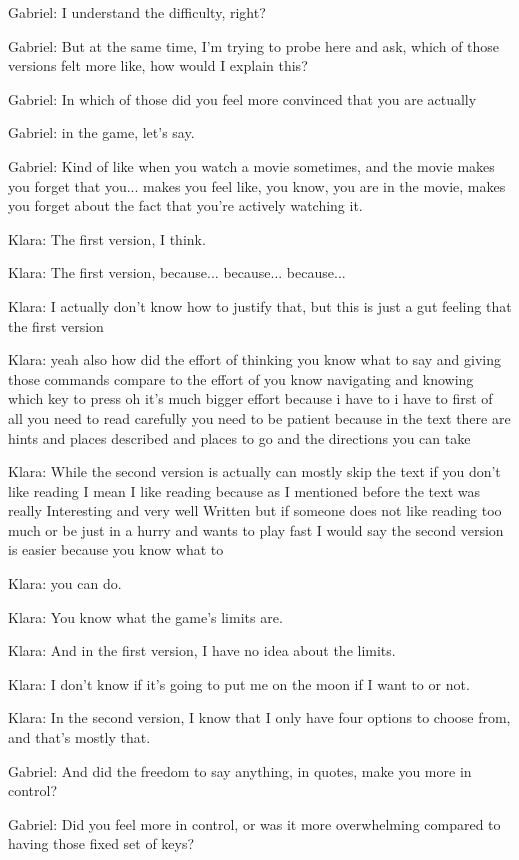Gabriel: I understand the difficulty, right?

Gabriel: But at the same time, I'm trying to probe here and ask, which of those versions felt more like, how would I explain this?

Gabriel: In which of those did you feel more convinced that you are actually

Gabriel: in the game, let's say.

Gabriel: Kind of like when you watch a movie sometimes, and the movie makes you forget that you... makes you feel like, you know, you are in the movie, makes you forget about the fact that you're actively watching it.

Klara: The first version, I think.

Klara: The first version, because... because... because...

Klara: I actually don't know how to justify that, but this is just a gut feeling that the first version

Klara: yeah also how did the effort of thinking you know what to say and giving those commands compare to the effort of you know navigating and knowing which key to press oh it's much bigger effort because i have to i have to first of all you need to read carefully you need to be patient because in the text there are hints and places described and places to go and the directions you can take

Klara: While the second version is actually can mostly skip the text if you don't like reading I mean I like reading because as I mentioned before the text was really Interesting and very well Written but if someone does not like reading too much or be just in a hurry and wants to play fast I would say the second version is easier because you know what to

Klara: you can do.

Klara: You know what the game's limits are.

Klara: And in the first version, I have no idea about the limits.

Klara: I don't know if it's going to put me on the moon if I want to or not.

Klara: In the second version, I know that I only have four options to choose from, and that's mostly that.

Gabriel: And did the freedom to say anything, in quotes, make you more in control?

Gabriel: Did you feel more in control, or was it more overwhelming compared to having those fixed set of keys?

